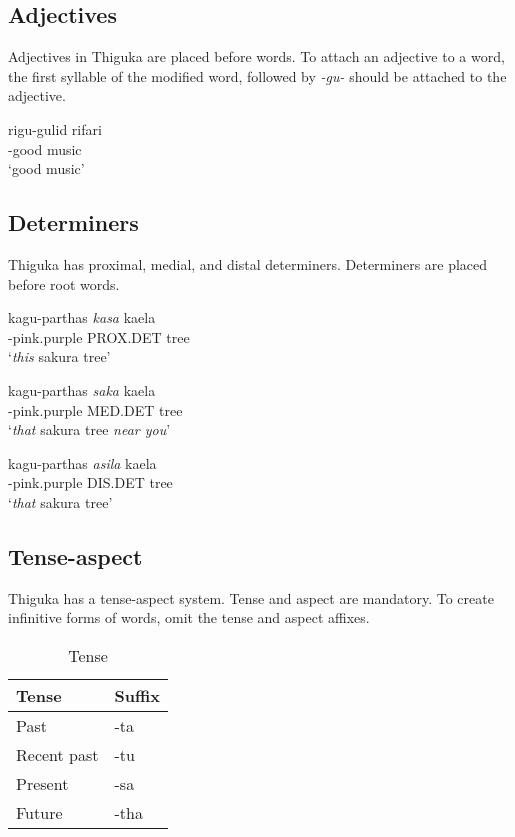 \subsection{Adjectives}
Adjectives in Thiguka are placed before words. To attach an adjective to a word, the first syllable of the modified word, followed by \emph{-gu-} should be attached to the adjective.

\begin{exe}
    \ex{} \gll{}ri\textapprox{}gu-gulid rifari\\
    \agradj{}-good music\\
    \glt{}`good music'
\end{exe}

\subsection{Determiners}
Thiguka has proximal, medial, and distal determiners. Determiners are placed before root words. 

\begin{exe}
    \ex{} \gll{}ka\textapprox{}gu-parthas \emph{kasa} kaela\\
    \agradj{}-pink.purple PROX.DET tree\\
    \glt{}`\emph{this} sakura tree'
\end{exe}

\begin{exe}
    \ex{} \gll{}ka\textapprox{}gu-parthas \emph{saka} kaela\\
    \agradj{}-pink.purple MED.DET tree\\
    \glt{}`\emph{that} sakura tree \emph{near you}'
\end{exe}

\begin{exe}
    \ex{} \gll{}ka\textapprox{}gu-parthas \emph{asila} kaela\\
    \agradj{}-pink.purple DIS.DET tree\\
    \glt{}`\emph{that} sakura tree'
\end{exe}

\subsection{Tense-aspect}
Thiguka has a tense-aspect system.
Tense and aspect are mandatory.
To create infinitive forms of words, omit the tense and aspect affixes.

\begin{table}[h!]
    \centering
    \caption{Tense}
    \begin{tabularx}{8cm}{|X|X|}
        \hline
        \textbf{Tense} & \textbf{Suffix} \\
        \hline
        Past & -ta \\
        Recent past & -tu \\
        Present & -sa \\
        Future & -tha \\
        \hline
    \end{tabularx}
\end{table}

